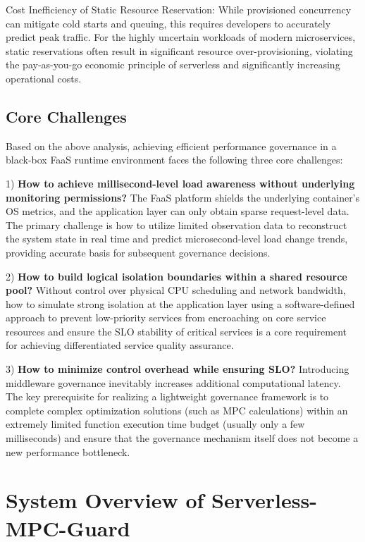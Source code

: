 \documentclass[journal]{IEEEtran}
\begin{document}
Cost Inefficiency of Static Resource Reservation: While provisioned concurrency can mitigate cold starts and queuing, this requires developers to accurately predict peak traffic. For the highly uncertain workloads of modern microservices, static reservations often result in significant resource over-provisioning, violating the pay-as-you-go economic principle of serverless and significantly increasing operational costs.

\subsection{Core Challenges}
Based on the above analysis, achieving efficient performance governance in a black-box FaaS runtime environment faces the following three core challenges:

1) \textbf{How to achieve millisecond-level load awareness without underlying monitoring permissions?} The FaaS platform shields the underlying container's OS metrics, and the application layer can only obtain sparse request-level data. The primary challenge is how to utilize limited observation data to reconstruct the system state in real time and predict microsecond-level load change trends, providing accurate basis for subsequent governance decisions.

2) \textbf{How to build logical isolation boundaries within a shared resource pool?} Without control over physical CPU scheduling and network bandwidth, how to simulate strong isolation at the application layer using a software-defined approach to prevent low-priority services from encroaching on core service resources and ensure the SLO stability of critical services is a core requirement for achieving differentiated service quality assurance.

3) \textbf{How to minimize control overhead while ensuring SLO?} Introducing middleware governance inevitably increases additional computational latency. The key prerequisite for realizing a lightweight governance framework is to complete complex optimization solutions (such as MPC calculations) within an extremely limited function execution time budget (usually only a few milliseconds) and ensure that the governance mechanism itself does not become a new performance bottleneck.

\section{System Overview of Serverless-MPC-Guard}
\label{ch:system-overview}
\end{document}

